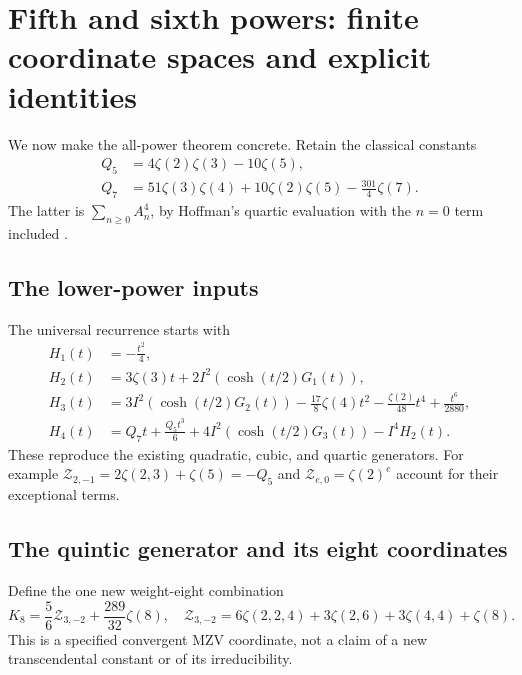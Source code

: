 \section{Fifth and sixth powers: finite coordinate spaces and explicit identities}
\label{tp:sec:examples}

We now make the all-power theorem concrete.  Retain the classical
constants
\begin{align}
 Q_5&=4\zeta(2)\zeta(3)-10\zeta(5),\label{tp:eq:Q5}\\
 Q_7&=51\zeta(3)\zeta(4)+10\zeta(2)\zeta(5)
                       -\frac{301}{4}\zeta(7).\label{tp:eq:Q7}
\end{align}
The latter is $\sum_{n\geq0}A_n^4$, by Hoffman's quartic evaluation
with the $n=0$ term included \cite{HoffmanTails,RepoQuartic}.

\subsection{The lower-power inputs}

The universal recurrence starts with
\begin{align}
 H_1(t)&=-\frac{t^2}{4},\label{tp:eq:H1}\\
 H_2(t)&=3\zeta(3)t+2I^2(\cosh(t/2)G_1(t)),\label{tp:eq:H2}\\
 H_3(t)&=3I^2(\cosh(t/2)G_2(t))
      -\frac{17}{8}\zeta(4)t^2-\frac{\zeta(2)}{48}t^4
      +\frac{t^6}{2880},\label{tp:eq:H3}\\
 H_4(t)&=Q_7t+\frac{Q_5t^3}{6}
      +4I^2(\cosh(t/2)G_3(t))-I^4H_2(t).\label{tp:eq:H4}
\end{align}
These reproduce the existing quadratic, cubic, and quartic generators.
For example $\mathcal Z_{2,-1}=2\zeta(2,3)+\zeta(5)=-Q_5$ and
$\mathcal Z_{e,0}=\zeta(2)^e$ account for their exceptional terms.

\subsection{The quintic generator and its eight coordinates}

Define the one new weight-eight combination
\begin{equation}\label{tp:eq:K8}
 K_8=\frac56\mathcal Z_{3,-2}+\frac{289}{32}\zeta(8),
 \quad
 \mathcal Z_{3,-2}=
 6\zeta(2,2,4)+3\zeta(2,6)+3\zeta(4,4)+\zeta(8).
\end{equation}
This is a specified convergent MZV coordinate, not a claim of a new
transcendental constant or of its irreducibility.

